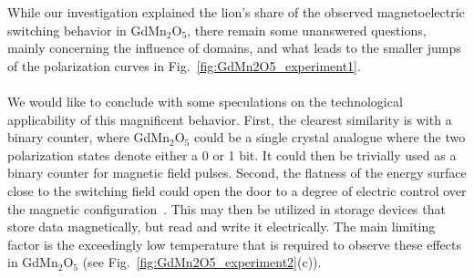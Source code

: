 While our investigation explained the lion's share of the observed magnetoelectric switching behavior in GdMn$_2$O$_5$, there remain some unanswered questions, mainly concerning the influence of domains, and what leads to the smaller jumps of the polarization curves in Fig.~\ref{fig:GdMn2O5_experiment1}.
\\\\
We would like to conclude with some speculations on the technological applicability of this magnificent behavior.
First, the clearest similarity is with a binary counter, where GdMn$_2$O$_5$ could be a single crystal analogue where the two polarization states denote either a 0 or 1 bit.
It could then be trivially used as a binary counter for magnetic field pulses.
Second, the flatness of the energy surface close to the switching field could open the door to a degree of electric control over the magnetic configuration~\cite{Radaelli08Y,Oh14}.
This may then be utilized in storage devices that store data magnetically, but read and write it electrically.
The main limiting factor is the exceedingly low temperature that is required to observe these effects in GdMn$_2$O$_5$ (see Fig.~\ref{fig:GdMn2O5_experiment2}(c)).
